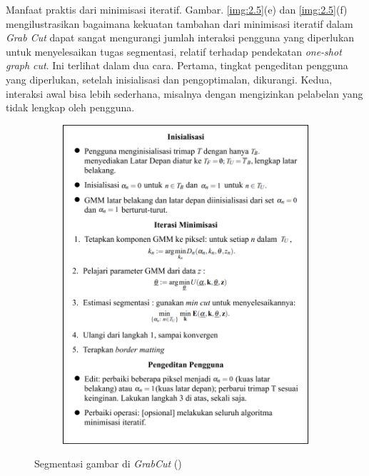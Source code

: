 Manfaat praktis dari minimisasi iteratif. Gambar. \ref{img:2.5}(e) dan \ref{img:2.5}(f) 
mengilustrasikan bagaimana kekuatan tambahan dari minimisasi iteratif dalam 
\emph{Grab Cut} dapat sangat mengurangi jumlah interaksi pengguna yang diperlukan 
untuk menyelesaikan tugas segmentasi, relatif terhadap pendekatan \emph{one-shot graph cut}. 
Ini terlihat dalam dua cara. Pertama, tingkat pengeditan pengguna yang diperlukan, 
setelah inisialisasi dan pengoptimalan, dikurangi. Kedua, interaksi awal bisa lebih 
sederhana, misalnya dengan mengizinkan pelabelan yang tidak lengkap oleh pengguna.

\begin{figure}[H]
  \centering
    \begin{subfigure}{0.5\textwidth}
      \centering{}
      \includegraphics[width=\textwidth]{gambar/gambar-2_6.png}
    \end{subfigure}     
  \caption{
    Segmentasi gambar di \emph{GrabCut} (\cite{Rother:2004})
    }
  \label{img:segmentasi_grabcut}
\end{figure}


